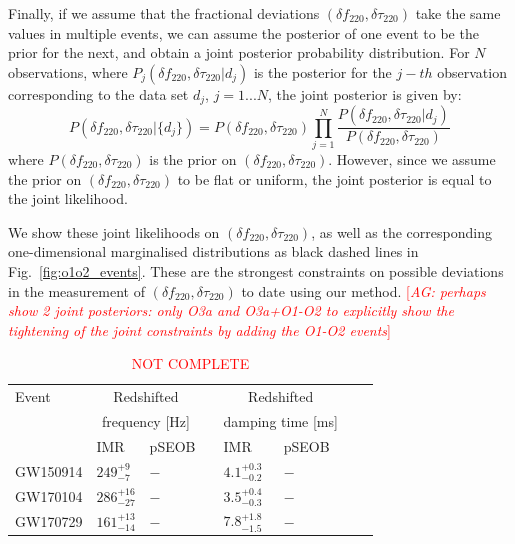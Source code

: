 \documentclass[twocolumn,prd,superscriptaddress,amsfonts,amssymb,amsmath,preprintnumbers]{revtex4-1}
\newcommand{\abhi}[1]{\textcolor{red}{[\textit{AG: #1}]}}
\newcommand{\df}[1]{\delta f_{\text{#1}}}
\newcommand{\dtau}[1]{\delta \tau_{\text{#1}}}
\begin{document}
Finally, if we assume that the fractional deviations $(\df{220}, \dtau{220})$ take the same values in multiple events, we can assume the posterior of one event to be the prior for the next, and obtain a joint posterior probability distribution. For $N$ observations, where $P_j(\df{220}, \dtau{220} | d_j)$ is the posterior for the $j-th$ observation corresponding to the data set $d_j$, $j=1...N$, the joint posterior is given by:
\begin{equation}
P(\df{220}, \dtau{220} | \{d_j\}) = P(\df{220}, \dtau{220}) \prod _{j=1}^N \frac{P(\df{220}, \dtau{220} | d_j) }{P(\df{220}, \dtau{220})}
\end{equation}
where $P(\df{220}, \dtau{220})$ is the prior on $(\df{220}, \dtau{220})$. However, since we assume the prior on $(\df{220}, \dtau{220})$ to be flat or uniform, the joint posterior is equal to the joint likelihood.

We show these joint likelihoods on $(\df{220}, \dtau{220})$, as well as the corresponding one-dimensional marginalised distributions as black dashed lines in Fig.~\ref{fig:o1o2_events}. These are the strongest constraints on possible deviations in the measurement of $(\df{220}, \dtau{220})$ to date using our method. \abhi{perhaps show 2 joint posteriors: only O3a and O3a+O1-O2 to explicitly show the tightening of the joint constraints by adding the O1-O2 events}

\begin{table}
\begin{center}
\begin{tabular}{llllllll}
\toprule
Event & \multicolumn{2}{c}{Redshifted} & \hphantom{X} & \multicolumn{2}{c}{Redshifted} \\
& \multicolumn{2}{c}{frequency [Hz]} & \hphantom{X} & \multicolumn{2}{c}{damping time [ms]} \\[0.075cm]
\cline{2-4}
\cline{6-8}
& IMR  & pSEOB & \hphantom{X} & IMR  & pSEOB \\
\midrule

GW150914 &
$249^{+9}_{-7}$ &
$-$ &
\hphantom{X} &
$4.1^{+0.3}_{-0.2}$ &
$-$
\\[0.075cm]

GW170104 &
$286^{+16}_{-27}$ &
$-$ &
\hphantom{X} &
$3.5^{+0.4}_{-0.3}$ &
$-$
\\[0.075cm]

GW170729 &
$161^{+13}_{-14}$ &
$-$ &
\hphantom{X} &
$7.8^{+1.8}_{-1.5}$ &
$-$
\\[0.075cm]

\bottomrule
\end{tabular}
\caption{\textcolor{red}{NOT COMPLETE}}
\label{tab:qnm_o1o2_results}
\end{center}
\end{table}
\end{document}

